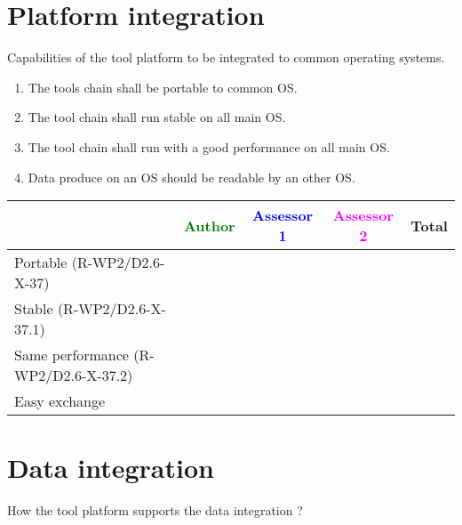 \section{Platform integration}
Capabilities of the tool platform to  be integrated to common operating systems.
\begin{enumerate}
\item  The tools chain shall be portable to common \gls{OS}.
\item   The tool chain shall run stable on all main \gls{OS}.
\item  The tool chain shall run with a good performance on all main \gls{OS}.
\item  Data produce on an \gls{OS} should be readable by an other \gls{OS}.
\end{enumerate}
\begin{tabular}{|l | c | c | c | c|}
  \hline
  & \textcolor{green}{Author} & \textcolor{blue}{Assessor 1} &  \textcolor{magenta}{Assessor 2} & Total \\
  \hline  Portable (R-WP2/D2.6-X-37) &
  &                 &                  &\\
  \hline   Stable (R-WP2/D2.6-X-37.1)&
  &                 &                  &\\
  \hline   Same performance (R-WP2/D2.6-X-37.2)&
  &                 &                  &\\
  \hline  Easy exchange&
  &                 &                  &\\
  \hline
\end{tabular}


\section{Data integration}
How the tool platform supports the data integration ?

